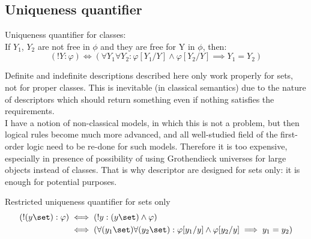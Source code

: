 \subsection{Uniqueness quantifier}
\begin{definition}
\label{def:uniqueness quantifier}
Uniqueness quantifier for classes:\\
If $Y_1$, $Y_2$ are not free in $\phi$ and they are free for Y in $\phi$, then:
\[
(!Y:\varphi)\iff (\forall Y_1\forall Y_2:\varphi[Y_1/Y]\land\varphi[Y_2/Y]\implies Y_1=Y_2)
\]
\end{definition}
\begin{note}

Definite and indefinite descriptions described here only work properly for sets, not for proper classes. This is inevitable (in classical semantics) due to the nature of descriptors which should return something even if nothing  satisfies the requirements.\\
I have a notion of non-classical models, in which this is not a problem, but then logical rules become much more advanced, and all well-studied field of the first-order logic need to be re-done for such models. Therefore it is too expensive, especially in presence of possibility of using Grothendieck universes for large objects instead of classes. That is why descriptor are designed for sets only: it is enough for potential purposes.\\
\end{note}
\begin{definition}
\label{def:restricted uniqueness quantifier}
Restricted uniqueness quantifier for sets only
\begin{align*}
(!(y\set):\varphi)
&\iff 
(!y:(y\set)\land\varphi)
\\
&\iff 
(\forall (y_1\set)\forall (y_2\set):\varphi[y_1/y]\land\varphi[y_2/y]\implies y_1=y_2)
\end{align*}

\end{definition}

